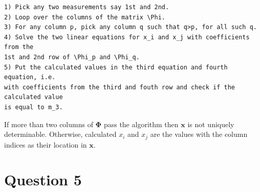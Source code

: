 \documentclass[12pt]{article}
\begin{document}
\begin{verbatim}
1) Pick any two measurements say 1st and 2nd.
2) Loop over the columns of the matrix \Phi.
3) For any column p, pick any column q such that q>p, for all such q.
4) Solve the two linear equations for x_i and x_j with coefficients from the 
1st and 2nd row of \Phi_p and \Phi_q.
5) Put the calculated values in the third equation and fourth equation, i.e. 
with coefficients from the third and fouth row and check if the calculated value 
is equal to m_3.
\end{verbatim}
If more than two columns of $\boldsymbol{\Phi}$ pass the algorithm then $\boldsymbol{x}$ is not uniquely determinable. Otherwise, calculated $x_i$ and $x_j$ are the values with the column indices as their location in $\boldsymbol{x}$.
\clearpage

\section*{Question 5}
\end{document}
